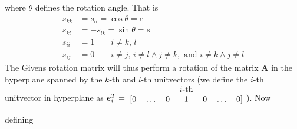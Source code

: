 \documentclass{emulateapj}
\newcommand\sini[0]{\sin{\theta}}
\newcommand\cosi[0]{\cos{\theta}}
\begin{document}
        where \(\theta\) defines the rotation angle. That is 
        \begin{align*}
            s_{kk} &= s_{ll} = \cosi = c
            \\
            s_{kl} &= -s_{lk} = \sini = s
            \\
            s_{ii} &= 1 \qquad i \neq k,\, l
            \\
            s_{ij} &= 0 \qquad i \neq j,\, i\neq l\land j\neq k,\text{ and } i\neq k\land j\neq l
        \end{align*}
        The Givens rotation matrix will thus perform a rotation of the matrix \(\bm{A}\) in the hyperplane spanned by the \(k\)-th and \(l\)-th unitvectors (we define the \(i\)-th unitvector in hyperplane as \(\bm{e}_{i}^{T} = 
        \begin{blockarray}{ccccccc}
         &&&i\text{-th}&&& \\
        \begin{block}{[ccccccc]}
        0&\ldots&0&1&0&\ldots&0 \\
        \end{block}
        \end{blockarray}
        \)). 
        Now defining
        
\end{document}
